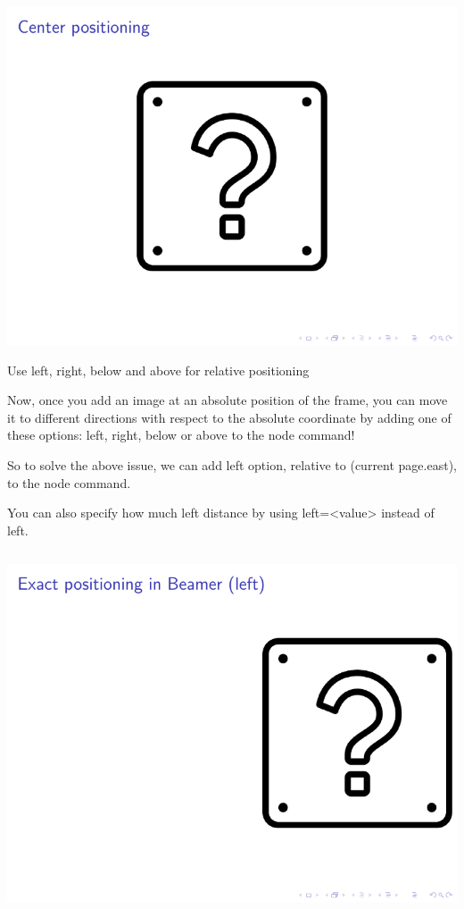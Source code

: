 \begin{column}{0.5\textwidth}
\includegraphics[page=2]{examples/beamer/beamerfigure06.pdf}

Use left, right, below and above for relative positioning

Now, once you add an image at an absolute position of the frame, you can move it to different directions with respect to the absolute coordinate by adding one of these options: left, right, below or above to the node command!

So to solve the above issue, we can add left option, relative to (current page.east), to the node command.

You can also specify how much left distance by using left=<value> instead of left. 

\inputminted[linenos=true]{latex}{examples/beamer/beamerfigure07.tex}

\includegraphics[page=1]{examples/beamer/beamerfigure07.pdf}


\end{column}
